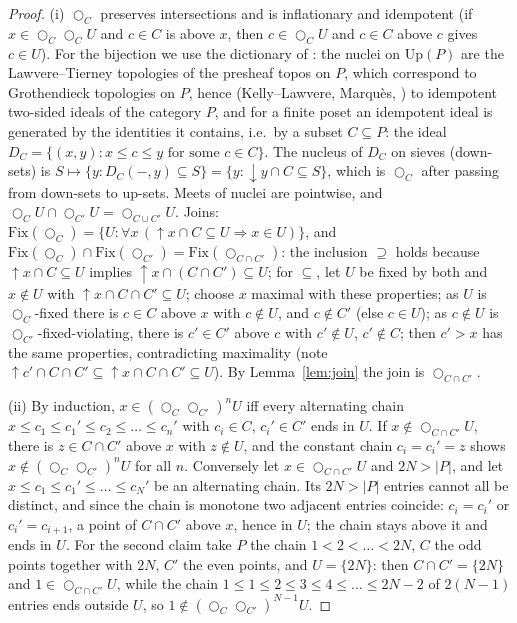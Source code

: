 \documentclass[11pt]{amsart}
\theoremstyle{definition}
\newcommand{\Fix}{\mathrm{Fix}}
\newcommand{\Up}{\mathrm{Up}}
\newcommand{\lax}{\bigcirc}
\begin{document}
\begin{proof}
(i) $\lax_C$ preserves intersections and is inflationary and idempotent
(if $x\in\lax_C\lax_CU$ and $c\in C$ is above $x$, then $c\in\lax_CU$ and $c\in C$
above $c$ gives $c\in U$). For the bijection we use the dictionary of
\cite[\S2]{Finitejoin}: the nuclei on $\Up(P)$ are the Lawvere--Tierney
topologies of the presheaf topos on $P$, which correspond to Grothendieck
topologies on $P$, hence (Kelly--Lawvere, Marqu\`es, \cite[Thm.~5.1]{Postnikov})
to idempotent two-sided ideals of the category $P$, and for a finite poset an
idempotent ideal is generated by the identities it contains, i.e.\ by a subset
$C\subseteq P$: the ideal $D_C=\{(x,y):x\le c\le y\text{ for some }c\in C\}$.
The nucleus of $D_C$ on sieves (down-sets) is $S\mapsto\{y:D_C(-,y)\subseteq S\}
=\{y:\downarrow\!y\cap C\subseteq S\}$, which is $\lax_C$ after passing from
down-sets to up-sets. Meets of nuclei are pointwise, and
$\lax_CU\cap\lax_{C'}U=\lax_{C\cup C'}U$. Joins: $\Fix(\lax_C)=\{U:\forall x\,
(\uparrow\!x\cap C\subseteq U\Rightarrow x\in U)\}$, and
$\Fix(\lax_C)\cap\Fix(\lax_{C'})=\Fix(\lax_{C\cap C'})$: the inclusion
$\supseteq$ holds because $\uparrow\!x\cap C\subseteq U$ implies
$\uparrow\!x\cap(C\cap C')\subseteq U$; for $\subseteq$, let $U$ be fixed by both
and $x\notin U$ with $\uparrow\!x\cap C\cap C'\subseteq U$; choose $x$ maximal
with these properties; as $U$ is $\lax_C$-fixed there is $c\in C$ above $x$
with $c\notin U$, and $c\notin C'$ (else $c\in U$); as $c\notin U$ is
$\lax_{C'}$-fixed-violating, there is $c'\in C'$ above $c$ with $c'\notin U$,
$c'\notin C$; then $c'>x$ has the same properties, contradicting maximality
(note $\uparrow\!c'\cap C\cap C'\subseteq\uparrow\!x\cap C\cap C'\subseteq U$).
By Lemma~\ref{lem:join} the join is $\lax_{C\cap C'}$.

(ii) By induction, $x\in(\lax_C\lax_{C'})^nU$ iff every alternating chain
$x\le c_1\le c_1'\le c_2\le\dots\le c_n'$ with $c_i\in C$, $c_i'\in C'$ ends in
$U$. If $x\notin\lax_{C\cap C'}U$, there is $z\in C\cap C'$ above $x$ with
$z\notin U$, and the constant chain $c_i=c_i'=z$ shows $x\notin(\lax_C\lax_{C'})^nU$
for all $n$. Conversely let $x\in\lax_{C\cap C'}U$ and $2N>|P|$, and let
$x\le c_1\le c_1'\le\dots\le c_N'$ be an alternating chain. Its $2N>|P|$
entries cannot all be distinct, and since the chain is monotone two adjacent
entries coincide: $c_i=c_i'$ or $c_i'=c_{i+1}$, a point of $C\cap C'$ above
$x$, hence in $U$; the chain stays above it and ends in $U$. For the second
claim take $P$ the chain $1<2<\dots<2N$, $C$ the odd points together with
$2N$, $C'$ the even points, and $U=\{2N\}$: then $C\cap C'=\{2N\}$ and
$1\in\lax_{C\cap C'}U$, while the chain $1\le1\le2\le3\le4\le\dots\le2N-2$
of $2(N-1)$ entries ends outside $U$, so $1\notin(\lax_C\lax_{C'})^{N-1}U$.


\end{proof}
\end{document}
